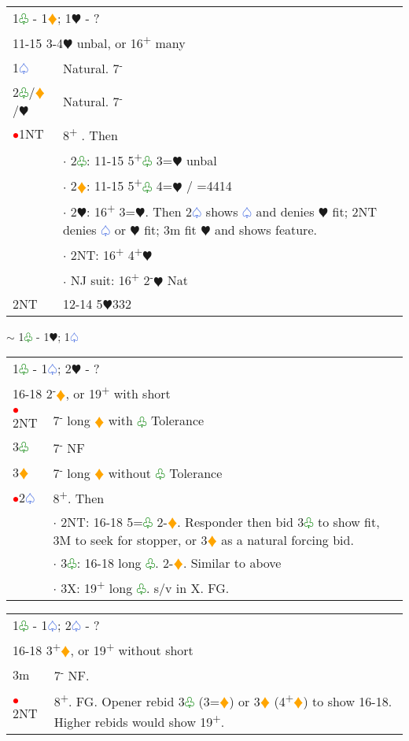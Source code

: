 \documentclass{article}
\renewcommand{\sp}{\textcolor{RoyalBlue}{$\varspade$}}
\newcommand{\he}{\textcolor{RubineRed}{$\varheart$}}
\newcommand{\di}{\textcolor{Orange}{$\vardiamond$}}
\newcommand{\cl}{\textcolor{Green}{$\varclub$}}
\newcommand{\nt}{\relsize{-1}NT\relsize{1}}
\newcommand{\up}{\textsuperscript{+}}
\newcommand{\down}{\textsuperscript{-}}
\newcommand{\al}{\textcolor{red}{$\bullet$}}
\begin{document}
\begin{tabular}{|l|p{6.5cm}}
	\multicolumn{2}{l}{1\cl{} - 1\di{}; 1\he{} - ?}\\
	\multicolumn{2}{l}{11-15 3-4\he{} unbal, or 16\up{} many}\\
    1\sp{} & Natural. 7\down{} \\
    2\cl{}/\di{}/\he{} & Natural. 7\down{} \\
    \al{}1\nt{} & 8\up{} . Then \\
    & $\cdot$ 2\cl{}: 11-15 5\up{}\cl{} 3=\he{} unbal \\
    & $\cdot$ 2\di{}: 11-15 5\up{}\cl{} 4=\he{} / =4414 \\
    & $\cdot$ 2\he{}: 16\up{} 3=\he{}. Then 2\sp{} shows \sp{} and denies \he{} fit; 2\nt{} denies \sp{} or \he{} fit; 3m fit \he{} and shows feature. \\
    & $\cdot$ 2\nt{}: 16\up{} 4\up{}\he{} \\
    & $\cdot$ NJ suit: 16\up{} 2\down{}\he{} Nat \\
		2\nt{} & 12-14 5\he{}332 \\ 
\end{tabular}

$\sim$ 1\cl{} - 1\he{}; 1\sp{}\\

\begin{tabular}{|l|p{6.5cm}}
	\multicolumn{2}{l}{1\cl{} - 1\sp{}; 2\he{} - ?} \\
	\multicolumn{2}{l}{16-18 2\down{}\di{}, or 19\up{} with short} \\
	\al{}2\nt{} & 7\down{} long \di{} with \cl{} Tolerance \\
	3\cl{} & 7\down{} NF \\
	3\di{} & 7\down{} long \di{} without \cl{} Tolerance \\
	\al{}2\sp{} & 8\up{}. Then \\
	& $\cdot$ 2\nt: 16-18 5=\cl{} 2-\di{}. Responder then bid 3\cl{} to show fit, 3M to seek for stopper, or 3\di{} as a natural forcing bid. \\
	& $\cdot$ 3\cl{}: 16-18 long \cl{}. 2-\di{}. Similar to above \\
	& $\cdot$ 3X: 19\up{} long \cl{}. s/v in X. FG. \\
\end{tabular}

\medskip

\begin{tabular}{|l|p{6.5cm}}
	\multicolumn{2}{l}{1\cl{} - 1\sp{}; 2\sp{} - ?}\\
	\multicolumn{2}{l}{16-18 3\up{}\di{}, or 19\up{} without short} \\
	3m & 7\down{} NF. \\
	\al{}2\nt & 8\up{}. FG. Opener rebid 3\cl{} (3=\di{}) or 3\di{} (4\up{}\di{}) to show 16-18. Higher rebids would show 19\up{}. \\
\end{tabular}
\end{document}
